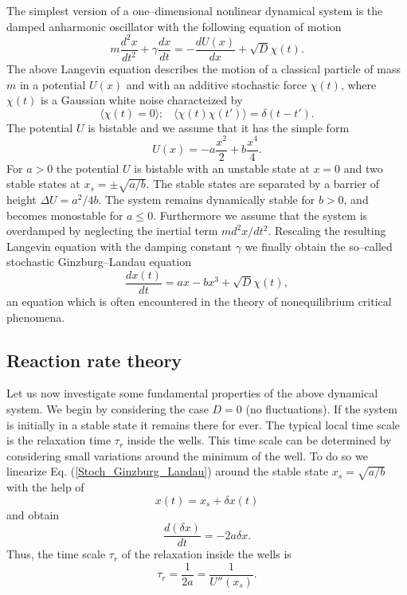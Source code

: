 The simplest version of a one--dimensional nonlinear dynamical system 
is the damped anharmonic oscillator with the following equation of motion
\begin{equation}
m \frac{d^2x}{dt^2} + \gamma \frac{dx}{dt} = - \frac{dU(x)}{dx} 
 + \sqrt{D} \chi(t).
\end{equation}
The above Langevin equation describes the motion of a classical particle of
mass $m$ in a potential $U(x)$ and with an additive stochastic force
$\chi(t)$,
where $\chi(t)$
is a Gaussian white noise characteized by
\begin{equation}
\langle \chi(t) =0 \rangle; \;\;\; \langle \chi(t) \chi(t')\rangle =
\delta(t - t').
\end{equation}
The potential $U$ is bistable and we assume that it has the simple form
\begin{equation}
U(x) = -a \frac{x^2}{2} + b \frac{x^4}{4}.
\end{equation}
For $a> 0$ the potential $U$ is bistable with an unstable state at $x=0$
and two stable states at $x_s = \pm \sqrt{a/b}$. The stable states are
separated by a barrier of height $\Delta U = a^2/4b$. The system remains
dynamically stable for $b>0$, and becomes monostable for $a \le 0$.
Furthermore we assume that the system is overdamped by neglecting the inertial
term $m d^2x/dt^2$. 
Rescaling the resulting Langevin equation with the damping constant
$\gamma$  we finally obtain the so--called stochastic Ginzburg--Landau
equation
\begin{equation}
\label{Stoch_Ginzburg_Landau}
\frac{dx(t)}{dt} = ax - bx^3 + \sqrt{D} \chi(t),
\end{equation}
an equation which is often encountered in the theory of nonequilibrium
critical phenomena. 

\subsection{Reaction rate theory}
Let us now investigate some fundamental properties of the above dynamical
system. We begin by considering the case $D=0$ (no fluctuations). If the 
system is initially in a stable state it remains there for ever. 
The typical local
time scale is the relaxation time $\tau_r$ inside the wells. This time scale 
can be determined by considering small variations around the 
minimum of the well.
To do so we linearize Eq. (\ref{Stoch_Ginzburg_Landau}) 
around the stable state $x_s = \sqrt{a/b}$ with the help of
\begin{equation}
x(t) = x_s + \delta x(t)
\end{equation}
and obtain
\begin{equation}
\frac{d(\delta x)}{dt} = -2a \delta x.
\end{equation}
Thus, the  time scale $\tau_r$ of the relaxation inside the wells is
\begin{equation}
  \tau_r = \frac{1}{2a} = \frac{1}{U''(x_s)}.
\end{equation}

